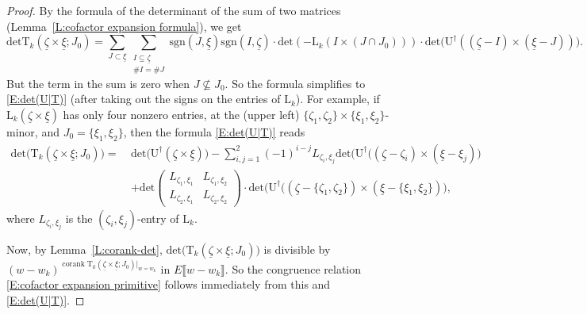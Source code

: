 \documentclass[12pt]{amsart}
\theoremstyle{definition}
\numberwithin{equation}{subsection}
\def\rmL{\mathrm{L}}
\def\rmU{\mathrm{U}}
\def\rmT{\mathrm{T}}
\renewcommand{\det}{\mathrm{det}}
\newcommand{\sgn}{\mathrm{sgn}}
\DeclareMathOperator{\corank}{corank}
\newcommand{\MATRIX}[4]{{\begin{pmatrix}#1&#2\\#3& #4\end{pmatrix}}}
\begin{document}
\begin{proof}
By the formula of the determinant of the sum of two matrices (Lemma~\ref{L:cofactor expansion formula}), we get
$$
\det \rmT_k(\underline \zeta \times \underline \xi; J_0) = \sum_{J \subset \underline \xi}\sum_{\substack{I \subseteq \underline \zeta\\ \#I = \# J}} \sgn(J, \underline \xi) \sgn(I, \underline \zeta)\cdot \det (-\rmL_k(I \times (J \cap J_0))) \cdot  \det\big( \rmU^\dagger((\underline \zeta - I) \times (\underline \xi-J))\big).
$$
But the term in the sum is zero when $J \not \subseteq J_0$. So the formula simplifies to \eqref{E:det(U|T)} (after taking out the signs on the entries of $\rmL_k$).
For example, if $\rmL_k(\underline \zeta \times 
\underline \xi)$ has only four nonzero entries, at the (upper left) 
$\{\zeta_1,\zeta_2\} \times \{\xi_1, \xi_2\}$-minor, and $J_0 = \{\xi_1, 
\xi_2\}$, then the formula 
\eqref{E:det(U|T)} reads
\begin{align*}
\det\big(\rmT_k(\underline \zeta \times \underline \xi; J_0)\big) =\ & \det 
\big(\rmU^\dagger(\underline \zeta \times \underline \xi)\big)  - 
\sum_{i,j=1}^2 (-1)^{i-j} L_{\zeta_i, \xi_j} \det 
\big(\rmU^\dagger((\underline \zeta - \zeta_i) \times (\underline 
\xi-\xi_j)\big) 
\\
& +\det \MATRIX{L_{\zeta_1,\xi_1}}{L_{\zeta_1,\xi_2}}{L_{\zeta_2,\xi_1}}{L_{\zeta_2,\xi_2}} \cdot  \det \big(\rmU^\dagger((\underline \zeta -\{\zeta_1,  \zeta_2\}) \times (\underline \xi-\{\xi_1, \xi_2\})\big),
\end{align*}
where $L_{\zeta_i, \xi_j}$ is the $(\zeta_i, \xi_j)$-entry of $\rmL_k$.


Now, by Lemma~\ref{L:corank-det}, $\det\big(\rmT_k(\underline \zeta \times \underline \xi; J_0)\big)$ is divisible by  
$(w-w_k)^{\corank \rmT_k(\underline \zeta \times \underline \xi; 
J_0)|_{w=w_k}}$ in $E\llbracket w-w_k\rrbracket $. So the congruence relation \eqref{E:cofactor expansion primitive} follows 
immediately from this and \eqref{E:det(U|T)}.
\end{proof}
\end{document}
